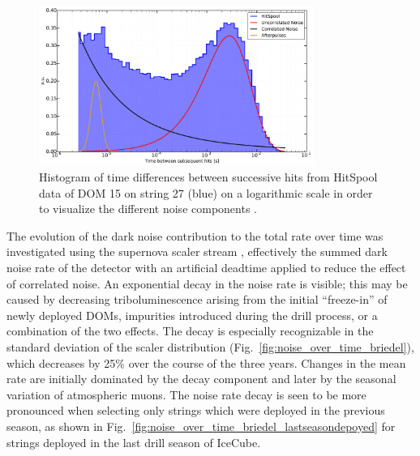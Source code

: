 \begin{figure}[!h]
 \centering
  \includegraphics[width=0.8\textwidth]{graphics/dom/performance/darknoise/SingleDOM_HitSpool_Hits_deltaT_fits_example.pdf}
 \caption{Histogram of time differences between successive hits from HitSpool data of
DOM 15 on string 27 (blue) on a logarithmic scale in order to visualize the
different noise components \cite{heereman2015hitspooling}.}
 \label{fig:darknoise_deltaT_components}
\end{figure}

The evolution of the dark noise contribution to the total rate over time was investigated using the
supernova scaler stream \cite{IC3:supernova, briedel_phd}, effectively 
the summed dark noise rate of the detector with an artificial deadtime
applied to reduce the effect of correlated noise. An exponential decay in
the noise rate is visible; this may be caused by 
decreasing triboluminescence arising from the initial ``freeze-in''
of newly deployed DOMs, impurities introduced during the drill
process, or a combination of the two effects.  The decay
is especially recognizable in the standard deviation of the scaler
distribution (Fig.~\ref{fig:noise_over_time_briedel}), which decreases by
25\% over the course of the three years. Changes in the mean rate are
initially dominated by the decay component and later by the seasonal
variation of atmospheric muons. The noise
rate decay is seen to be more pronounced when selecting only strings
which were deployed in the previous season, as shown in Fig.~\ref{fig:noise_over_time_briedel_lastseasondepoyed} for strings deployed in the last drill season of IceCube.


